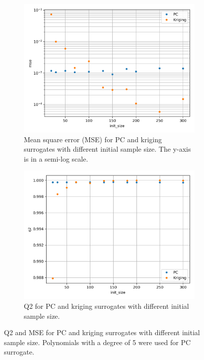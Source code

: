 \documentclass[hidelinks,12pt]{article}
\begin{document}
\begin{figure}
  \centering
  \begin{subfigure}{0.8\textwidth}
	\centering
	\includegraphics[width=\textwidth]{images/init_size_mse.png}
	\caption{Mean square error (MSE) for PC and kriging surrogates with different initial sample size. The y-axis is in a semi-log scale.}
	\label{init_size:mse}
  \end{subfigure}
  \begin{subfigure}{0.8\textwidth}
  	\centering
	\includegraphics[width=\textwidth]{images/init_size_q2.png}
	\caption{Q2 for PC and kriging surrogates with different initial sample size.}
	\label{init_size:q2}
  \end{subfigure}
  \caption{Q2 and MSE for PC and kriging surrogates with different initial sample size. Polynomials with a degree of 5 were used for PC surrogate.}
  \label{init_size}
\end{figure}
\end{document}
